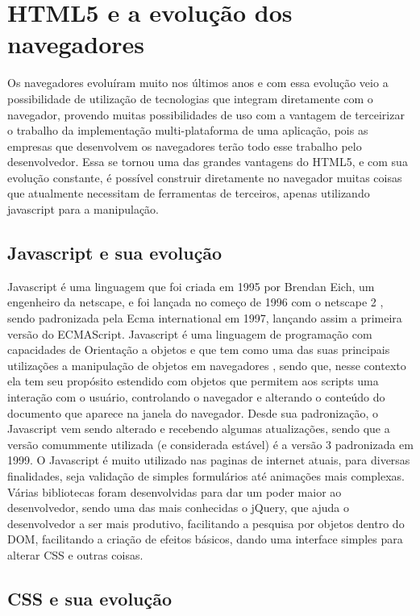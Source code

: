 \section{HTML5 e a evolução dos navegadores}

Os navegadores evoluíram muito nos últimos anos e com essa evolução
veio a possibilidade de utilização de tecnologias que integram
diretamente com o navegador, provendo muitas possibilidades de uso com
a vantagem de terceirizar o trabalho da implementação multi-plataforma
de uma aplicação, pois as empresas que desenvolvem os navegadores
terão todo esse trabalho pelo desenvolvedor. Essa se tornou uma das
grandes vantagens do HTML5, e com sua evolução constante, é possível
construir diretamente no navegador muitas coisas que atualmente necessitam
de ferramentas de terceiros, apenas utilizando javascript para a
manipulação.

\subsection{Javascript e sua evolução}

Javascript é uma linguagem que foi criada em 1995 por Brendan Eich,
um engenheiro da netscape, e foi lançada no começo de 1996 com o
netscape 2 \cite{mdnjavascript}, sendo padronizada pela Ecma
international em 1997, lançando assim a primeira versão do ECMAScript.
Javascript é uma linguagem de programação com capacidades de Orientação a objetos e que tem como uma das suas principais
utilizações a manipulação de objetos em navegadores \cite{flanagan2006javascript}, sendo que, nesse contexto
ela tem seu propósito estendido com objetos que permitem aos scripts uma interação com o usuário,
controlando o navegador e alterando o conteúdo do documento que aparece na janela do navegador.
Desde sua padronização, o Javascript vem sendo alterado e
recebendo algumas atualizações, sendo que a versão comummente
utilizada (e considerada estável) é a versão 3 padronizada em 1999.
O Javascript é muito utilizado nas paginas de internet atuais, para
diversas finalidades, seja validação de simples formulários até
animações mais complexas. Várias bibliotecas foram desenvolvidas para
dar um poder maior ao desenvolvedor, sendo uma das mais conhecidas o
jQuery, que ajuda o desenvolvedor a ser mais produtivo, facilitando a
pesquisa por objetos dentro do DOM, facilitando a criação de efeitos
básicos, dando uma interface simples para alterar CSS e outras coisas.

\subsection{CSS e sua evolução}

